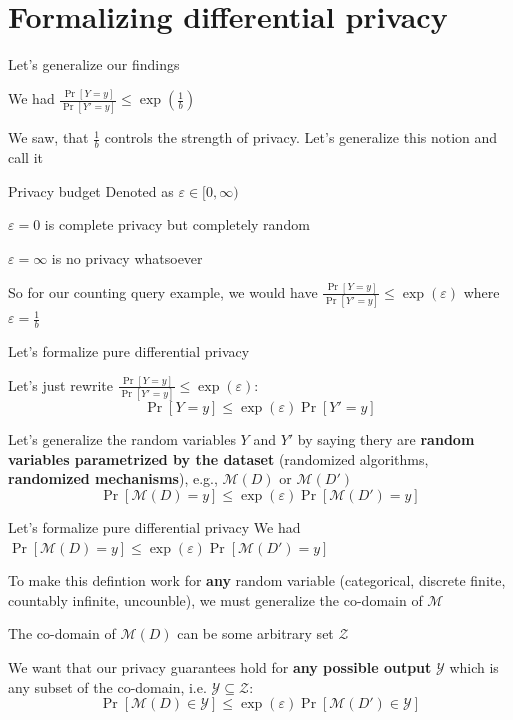 \documentclass[12pt,aspectratio=169,handout]{beamer}
\begin{document}
\section{Formalizing differential privacy}



\begin{frame}{Let's generalize our findings}

We had $\frac{\Pr[Y = y]}{\Pr[Y' = y]} \leq \exp(\frac{1}{b})$

We saw, that $\frac{1}{b}$ controls the strength of privacy. Let's generalize this notion and call it

\begin{block}{Privacy budget}
Denoted as $\varepsilon \in [0, \infty)$

$\varepsilon = 0$ is complete privacy but completely random

$\varepsilon = \infty$ is no privacy whatsoever
\end{block}
So for our counting query example, we would have
$\frac{\Pr[Y = y]}{\Pr[Y' = y]} \leq \exp(\varepsilon)$ where $\varepsilon = \frac{1}{b}$
\end{frame}


\begin{frame}{Let's formalize pure differential privacy}

Let's just rewrite $\frac{\Pr[Y = y]}{\Pr[Y' = y]} \leq \exp(\varepsilon)$:
$$
\Pr[Y = y] \leq \exp(\varepsilon) \Pr[Y' = y]
$$

Let's generalize the random variables $Y$ and $Y'$ by saying thery are \textbf{random variables parametrized by the dataset} (randomized algorithms, \textbf{randomized mechanisms}), e.g., $\mathcal{M}(D)$ or $\mathcal{M}(D')$
$$
\Pr[\mathcal{M}(D) = y] \leq \exp(\varepsilon) \Pr[\mathcal{M}(D') = y]
$$
\end{frame}


\begin{frame}{Let's formalize pure differential privacy}
We had $\Pr[\mathcal{M}(D) = y] \leq \exp(\varepsilon) \Pr[\mathcal{M}(D') = y]$

To make this defintion work for \textbf{any} random variable (categorical, discrete finite, countably infinite, uncounble), we must generalize the co-domain of $\mathcal{M}$

The co-domain of $\mathcal{M}(D)$ can be some arbitrary set $\mathcal{Z}$

We want that our privacy guarantees hold for \textbf{any possible output} $\mathcal{Y}$ which is any subset of the co-domain, i.e. $\mathcal{Y} \subseteq \mathcal{Z}$:
$$
\Pr[\mathcal{M}(D) \in \mathcal{Y}] \leq \exp(\varepsilon) \Pr[\mathcal{M}(D') \in \mathcal{Y}]
$$


\end{frame}
\end{document}
